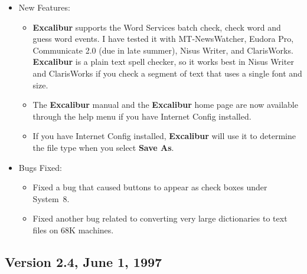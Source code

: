 \documentclass[11pt,titlepage]{article}
\newcommand{\ex}{\textbf{Excalibur}}
\begin{document}
\begin{itemize}
\item New Features:

  \begin{itemize}

  \item \ex{} supports the Word Services batch check, check word and
    guess word events.  I have tested it with MT-NewsWatcher, Eudora
    Pro, Communicate 2.0 (due in late summer), Nisus Writer, and
    ClarisWorks.  \ex{} is a plain text spell checker, so it works
    best in Nisus Writer and ClarisWorks if you check a segment of
    text that uses a single font and size.

  \item The \ex{} manual and the \ex{} home page are now available
    through the help menu if you have Internet Config installed.

  \item If you have Internet Config installed, \ex{} will use it to
    determine the file type when you select \textbf{Save As}.

  \end{itemize}

\item Bugs Fixed:

  \begin{itemize}

  \item Fixed a bug that caused buttons to appear as check boxes under
    System~8.

  \item Fixed another bug related to converting very large
    dictionaries to text files on 68K machines.

  \end{itemize}

\end{itemize}


\subsection{Version 2.4, June 1, 1997}
\end{document}
